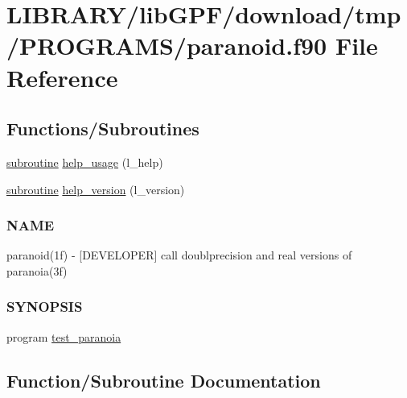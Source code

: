 \hypertarget{paranoid_8f90}{}\section{L\+I\+B\+R\+A\+R\+Y/lib\+G\+P\+F/download/tmp/\+P\+R\+O\+G\+R\+A\+M\+S/paranoid.f90 File Reference}
\label{paranoid_8f90}
\subsection*{Functions/\+Subroutines}
\begin{DoxyCompactItemize}
\item 
\hyperlink{M__stopwatch_83_8txt_acfbcff50169d691ff02d4a123ed70482}{subroutine} \hyperlink{paranoid_8f90_a3e09a3b52ee8fb04eeb93fe5761626a8}{help\+\_\+usage} (l\+\_\+help)
\item 
\hyperlink{M__stopwatch_83_8txt_acfbcff50169d691ff02d4a123ed70482}{subroutine} \hyperlink{paranoid_8f90_a39c21619b08a3c22f19e2306efd7f766}{help\+\_\+version} (l\+\_\+version)
\begin{DoxyCompactList}\small\item\em \subsubsection*{N\+A\+ME}

paranoid(1f) -\/ \mbox{[}D\+E\+V\+E\+L\+O\+P\+ER\mbox{]} call doublprecision and real versions of paranoia(3f) \subsubsection*{S\+Y\+N\+O\+P\+S\+IS}\end{DoxyCompactList}\item 
program \hyperlink{paranoid_8f90_a5ee1dc76ca482e8a4a44cbd213cce4c1}{test\+\_\+paranoia}
\end{DoxyCompactItemize}


\subsection{Function/\+Subroutine Documentation}
\mbox{\label{paranoid_8f90_a3e09a3b52ee8fb04eeb93fe5761626a8}} 

